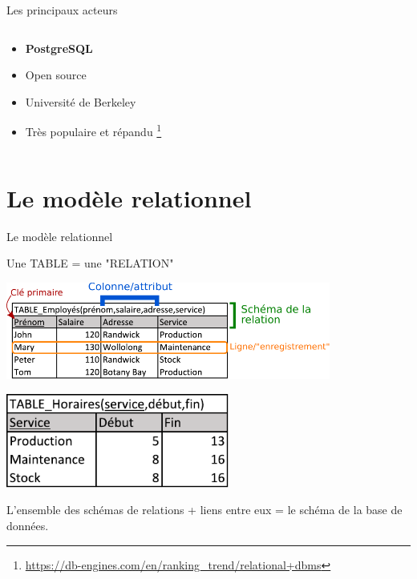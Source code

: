 \documentclass[xetex,dvipsnames]{beamer}
\begin{document}
\begin{frame}{Les principaux acteurs}
\begin{columns}
\begin{column}{0.5\textwidth}
\begin{center}
	    \end{center}
		\begin{itemize}
			\item \textbf{PostgreSQL}
			\item Open source
			\item Université de Berkeley
			\item Très populaire et répandu \footnote{{\tiny \url{https://db-engines.com/en/ranking_trend/relational+dbms}}}
		\end{itemize} 
	    \end{column}

    \end{columns}
\end{frame}



\section{Le modèle relationnel}
\begin{frame}{Le modèle relationnel}
		\begin{center}
			Une TABLE = une "RELATION"
	    \end{center}
			\vspace{0.3em}
	    	\includegraphics[width=0.8\textwidth]{./figures/relation.pdf}
	    	\vspace{0.3em}
	    	\pause
	    	\vspace*{0.3em}
\begin{flushright}
	    	\includegraphics[width=0.55\textwidth]{./figures/relation2.pdf}
\end{flushright}
 			\begin{center}
			L'ensemble des schémas de relations + liens entre eux = le schéma de la base de données.
	    \end{center}
\end{frame}
\end{document}
